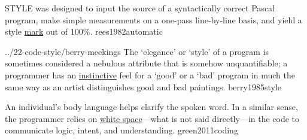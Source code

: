 \documentclass{article}
\begin{document}

  {STYLE was designed to input the source of a syntactically correct Pascal program, make simple measurements on a one-pass line-by-line basis, and yield a style \ul{mark} out of 100\%.}
  {rees1982automatic}

\lnQuote
  {../22-code-style/berry-meekings}
  {The `elegance' or `style' of a program is sometimes considered a nebulous attribute that is somehow unquantifiable; a programmer has an \ul{instinctive} feel for a `good' or a `bad' program in much the same way as an artist distinguishes good and bad paintings.}
  {berry1985style}

  {An individual's body language helps clarify the spoken word. In a similar sense, the programmer relies on \ul{white space}---what is not said directly---in the code to communicate logic, intent, and understanding.}
  {green2011coding}
\end{document}
